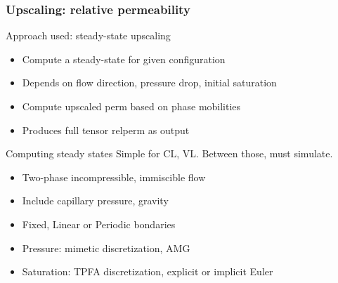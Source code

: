 \documentclass[UKenglish,10pt]{beamer}
\begin{document}
\begin{frame}
  \frametitle{Upscaling: relative permeability}
  \begin{block}{Approach used: steady-state upscaling}
    \begin{itemize}
    \item Compute a steady-state for given configuration
    \item Depends on flow direction, pressure drop, initial saturation
    \item Compute upscaled perm based on phase mobilities
    \item Produces full tensor relperm as output
    \end{itemize}
  \end{block}

  \begin{block}{Computing steady states}
    Simple for CL, VL. Between those, must simulate.
    \begin{itemize}
    \item Two-phase incompressible, immiscible flow
    \item Include capillary pressure, gravity
    \item Fixed, Linear or Periodic bondaries
    \item Pressure: mimetic discretization, AMG
    \item Saturation: TPFA discretization, explicit or implicit Euler
  \end{itemize}
  \end{block}
\end{frame}
\end{document}
